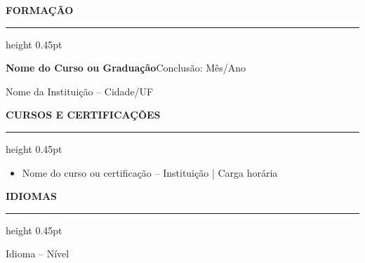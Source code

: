 \documentclass[9pt,a4paper]{extarticle}
\newcommand{\sectiontitle}[1]{%
  \vspace{4.6pt}%
  {\color{accent}\bfseries\normalsize\MakeUppercase{#1}}\par\vspace{1.6pt}%
  {\color{rulegray}\hrule height 0.45pt}\vspace{2.7pt}%
}
\begin{document}
\sectiontitle{Formação}
\textbf{Nome do Curso ou Graduação}\hfill {\color{muted}\small Conclusão: Mês/Ano}\par
Nome da Instituição -- Cidade/UF

\sectiontitle{Cursos e Certificações}
\begin{itemize}
  \item Nome do curso ou certificação -- Instituição | Carga horária
\end{itemize}

\sectiontitle{Idiomas}
Idioma -- Nível
\end{document}
